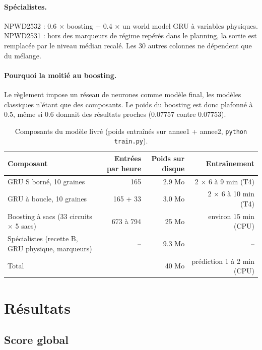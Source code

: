 \documentclass[11pt,a4paper]{article}
\newcommand{\code}[1]{\texttt{#1}}
\begin{document}
\paragraph{Spécialistes.} NPWD2532 : 0.6 × boosting + 0.4 × un world model GRU à variables physiques. NPWD2531 : hors des marqueurs de régime repérés dans le planning, la sortie est remplacée par le niveau médian recalé. Les 30 autres colonnes ne dépendent que du mélange.

\paragraph{Pourquoi la moitié au boosting.} Le règlement impose un réseau de neurones comme modèle final, les modèles classiques n'étant que des composants. Le poids du boosting est donc plafonné à 0.5, même si 0.6 donnait des résultats proches (0.07757 contre 0.07753).

\begin{table}[!htb]
\centering\small
\caption{Composants du modèle livré (poids entraînés sur annee1 + annee2, \code{python train.py}).}
\label{tab:composants}
\begin{tabularx}{\linewidth}{X r r r}
\toprule
Composant & Entrées par heure & Poids sur disque & Entraînement \\
\midrule
GRU S borné, 10 graines & 165 & 2.9 Mo & 2 × 6 à 9 min (T4) \\
GRU à boucle, 10 graines & 165 + 33 & 3.0 Mo & 2 × 6 à 10 min (T4) \\
Boosting à sacs (33 circuits × 5 sacs) & 673 à 794 & 25 Mo & environ 15 min (CPU) \\
Spécialistes (recette B, GRU physique, marqueurs) & -- & 9.3 Mo & -- \\
\midrule
Total & & 40 Mo & prédiction 1 à 2 min (CPU) \\
\bottomrule
\end{tabularx}
\end{table}

\section{Résultats}

\subsection{Score global}
\end{document}
